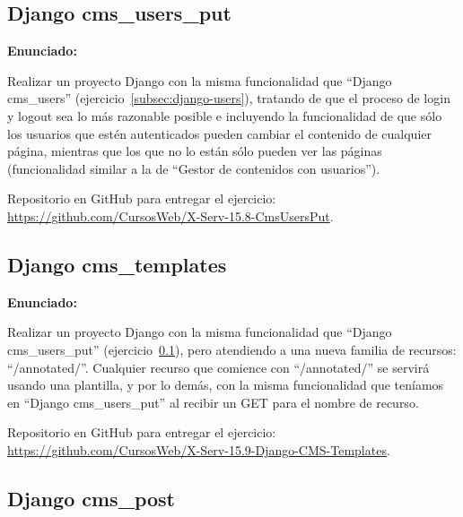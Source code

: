 \subsection{Django cms\_users\_put}
\label{subsec:django-users-put}

\textbf{Enunciado:}

Realizar un proyecto Django con la misma funcionalidad que ``Django cms\_users'' (ejercicio~\ref{subsec:django-users}), tratando de que el proceso de login y logout sea lo más razonable posible e incluyendo la funcionalidad de que sólo los usuarios que estén autenticados pueden cambiar el contenido de cualquier página, mientras que los que no lo están sólo pueden ver las páginas (funcionalidad similar a la de ``Gestor de contenidos con usuarios'').

Repositorio en GitHub para entregar el ejercicio: \\ 
\url{https://github.com/CursosWeb/X-Serv-15.8-CmsUsersPut}.


\subsection{Django cms\_templates}
\label{subsec:django-templates}

\textbf{Enunciado:}

Realizar un proyecto Django con la misma funcionalidad que ``Django cms\_users\_put'' (ejercicio~\ref{subsec:django-users-put}), pero atendiendo a una nueva familia de recursos: ``/annotated/''. Cualquier recurso que comience con ``/annotated/'' se servirá usando una plantilla, y por lo demás, con la misma funcionalidad que teníamos en ``Django cms\_users\_put'' al recibir un GET para el nombre de recurso.

Repositorio en GitHub para entregar el ejercicio: \\ 
\url{https://github.com/CursosWeb/X-Serv-15.9-Django-CMS-Templates}.

\subsection{Django cms\_post}
\label{subsec:django-post}

